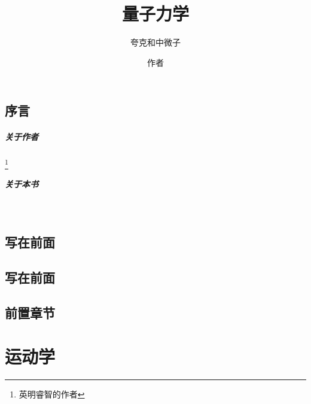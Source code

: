 \documentclass[color=COLORFUL]{textbook-cn}%
\title{量子力学}
\subtitle{夸克和中微子}
\author{作者}
\begin{document}
\maketitle


\frontmatter



\chapter*{序言}
\subsubsection{关于作者}\footnote{英明睿智的作者}
\lipsum
\subsubsection{关于本书}


\begin{center}
\scalebox{8}{\TextBook}\\[7.5pt]
\scalebox{8}{\TextBook*}
\end{center}

\chapter*{写在前面}
\lipsum


\chapter{写在前面}
\lipsum




\printnomenclature


\tableofcontents*

\listoffigures*


\listoftables*

\mainmatter
\tcbstartrecording






\chapter{前置章节}
\lipsum\lipsum\lipsum


\part{运动学}
\end{document}
